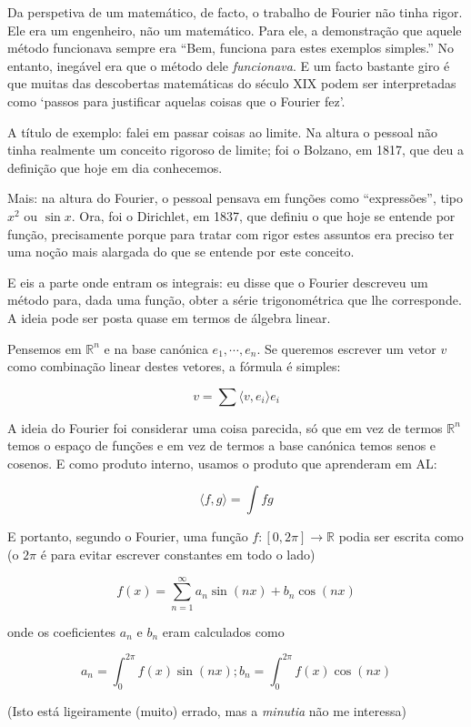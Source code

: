 \documentclass{article}
\newcommand{\R}{\mathbb{R}}
\begin{document}
Da perspetiva de um matemático, de facto, o trabalho de Fourier não tinha rigor. Ele era um engenheiro, não um matemático. Para ele, a demonstração que aquele método funcionava sempre era ``Bem, funciona para estes exemplos simples.'' No entanto, inegável era que o método dele \emph{funcionava}. E um facto bastante giro é que muitas das descobertas matemáticas do século XIX podem ser interpretadas como `passos para justificar aquelas coisas que o Fourier fez'.

A título de exemplo: falei em passar coisas ao limite. Na altura o pessoal não tinha realmente um conceito rigoroso de limite; foi o Bolzano, em 1817, que deu a definição que hoje em dia conhecemos.

Mais: na altura do Fourier, o pessoal pensava em funções como ``expressões'', tipo $x^2$ ou $\sin x$. Ora, foi o Dirichlet, em 1837, que definiu o que hoje se entende por função, precisamente porque para tratar com rigor estes assuntos era preciso ter uma noção mais alargada do que se entende por este conceito.

E eis a parte onde entram os integrais: eu disse que o Fourier descreveu um método para, dada uma função, obter a série trigonométrica que lhe corresponde. A ideia pode ser posta quase em termos de álgebra linear.

Pensemos em $\R^n$ e na base canónica $e_1, \cdots, e_n$. Se queremos escrever um vetor $v$ como combinação linear destes vetores, a fórmula é simples:

\[v = \sum \langle v, e_i \rangle e_i\]

A ideia do Fourier foi considerar uma coisa parecida, só que em vez de termos $\R^n$ temos o espaço de funções e em vez de termos a base canónica temos senos e cosenos. E como produto interno, usamos o produto que aprenderam em AL:

\[ \langle f, g \rangle = \int fg \]

E portanto, segundo o Fourier, uma função $f : [0, 2 \pi] \to \R$ podia ser escrita como (o $2 \pi$ é para evitar escrever constantes em todo o lado)

\[f(x) = \sum_{n = 1}^\infty a_n \sin( n x ) + b_n \cos ( n x )\]

onde os coeficientes $a_n$ e $b_n$ eram calculados como

\[a_n = \int_0^{2 \pi} f(x) \sin ( n x ); b_n = \int_0^{2 \pi} f(x) \cos ( n x )\]

(Isto está ligeiramente (muito) errado, mas a \emph{minutia} não me interessa)
\end{document}
